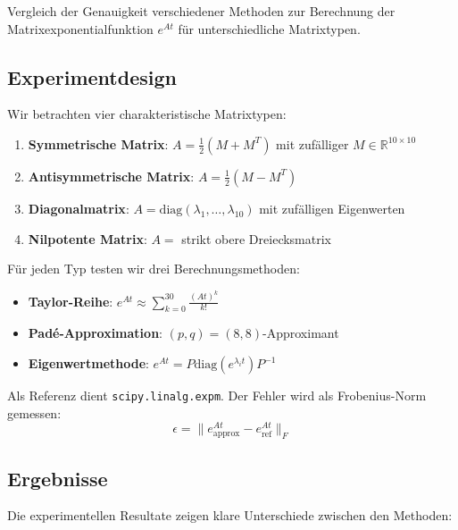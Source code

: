 \documentclass[a4paper,12pt]{report}
\theoremstyle{definition}
\begin{document}
	Vergleich der Genauigkeit verschiedener Methoden zur Berechnung der Matrixexponentialfunktion $e^{At}$ für unterschiedliche Matrixtypen.
	
	\subsection{Experimentdesign}
	
	Wir betrachten vier charakteristische Matrixtypen:
	
	\begin{enumerate}
		\item \textbf{Symmetrische Matrix}: $A = \frac{1}{2}(M + M^T)$ mit zufälliger $M \in \mathbb{R}^{10 \times 10}$
		\item \textbf{Antisymmetrische Matrix}: $A = \frac{1}{2}(M - M^T)$
		\item \textbf{Diagonalmatrix}: $A = \text{diag}(\lambda_1, \ldots, \lambda_{10})$ mit zufälligen Eigenwerten
		\item \textbf{Nilpotente Matrix}: $A = $ strikt obere Dreiecksmatrix
	\end{enumerate}
	
	Für jeden Typ testen wir drei Berechnungsmethoden:
	
	\begin{itemize}
		\item \textbf{Taylor-Reihe}: $e^{At} \approx \sum_{k=0}^{30} \frac{(At)^k}{k!}$
		\item \textbf{Padé-Approximation}: $(p,q) = (8,8)$-Approximant
		\item \textbf{Eigenwertmethode}: $e^{At} = P \text{diag}(e^{\lambda_i t}) P^{-1}$
	\end{itemize}
	
	Als Referenz dient \texttt{scipy.linalg.expm}. Der Fehler wird als Frobenius-Norm gemessen:
	\[
	\epsilon = \|e^{At}_{\text{approx}} - e^{At}_{\text{ref}}\|_F
	\]
	
	\subsection{Ergebnisse}
	
	Die experimentellen Resultate zeigen klare Unterschiede zwischen den Methoden:
	
\end{document}
